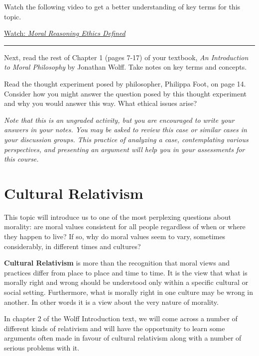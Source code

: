 \documentclass[
]{book}
\begin{document}
\begin{reflect}
Watch the following video to get a better understanding of key terms for this topic.

\href{https://www.youtube.com/watch?v=h_sufC5nY18}{Watch: \emph{Moral Reasoning \textbar{} Ethics Defined}}

\begin{center}\rule{0.5\linewidth}{0.5pt}\end{center}

Next, read the rest of Chapter 1 (pages 7-17) of your textbook, \emph{An Introduction to Moral Philosophy} by Jonathan Wolff. Take notes on key terms and concepts.

Read the thought experiment posed by philosopher, Philippa Foot, on page 14. Consider how you might answer the question posed by this thought experiment and why you would answer this way. What ethical issues arise?

\emph{Note that this is an ungraded activity, but you are encouraged to write your answers in your notes. You may be asked to review this case or similar cases in your discussion groups. This practice of analyzing a case, contemplating various perspectives, and presenting an argument will help you in your assessments for this course.}
\end{reflect}

\hypertarget{cultural-relativism}{%
\section{Cultural Relativism}\label{cultural-relativism}}

This topic will introduce us to one of the most perplexing questions about morality: are moral values consistent for all people regardless of when or where they happen to live? If so, why do moral values seem to vary, sometimes considerably, in different times and cultures?

\textbf{Cultural Relativism} is more than the recognition that moral views and practices differ from place to place and time to time. It is the view that what is morally right and wrong should be understood only within a specific cultural or social setting. Furthermore, what is morally right in one culture may be wrong in another. In other words it is a view about the very nature of morality.

In chapter 2 of the Wolff Introduction text, we will come across a number of different kinds of relativism and will have the opportunity to learn some arguments often made in favour of cultural relativism along with a number of serious problems with it.
\end{document}
